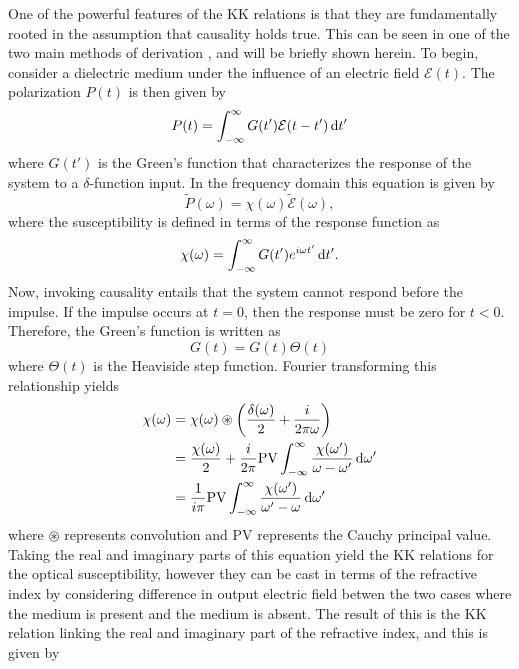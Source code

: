 One of the powerful features of the KK relations is that they are fundamentally rooted in the assumption that causality holds true.  This can be seen in one of the two main methods of derivation \cite{hutchingsKramersKronigRelationsNonlinear1992, jacksonClassicalElectrodynamics1999, arfkenMathematicalMethodsPhysicists2013}, and will be briefly shown herein.   To begin, consider a dielectric medium under the influence of an electric field $\mathcal{E}(t)$.  The polarization $P(t)$ is then given by
\begin{equation}
	P(t)=\int_{-\infty}^{\infty}G(t')\mathcal{E}(t-t') \mathop{}\!\mathrm{d} t'
\end{equation} 
where $G(t')$ is the Green's function that characterizes the response of the system to a $\delta$-function input.  In the frequency domain this equation is given by
\begin{equation}
	\tilde{P}(\omega)=\chi(\omega)\tilde{\mathcal{E}}(\omega),
\end{equation}
where the susceptibility is defined in terms of the response function as
\begin{equation}
	\chi(\omega)=\int_{-\infty}^{\infty}G(t')e^{i\omega t'}\mathop{}\!\mathrm{d} t'.
\end{equation}
Now, invoking causality entails that the system cannot respond before the impulse.  If the impulse occurs at $t=0$, then the response must be zero for $t<0$.  Therefore, the Green's function is written as
\begin{equation}
	G(t)=G(t)\Theta(t)
\end{equation}
where $\Theta(t)$ is the Heaviside step function.  Fourier transforming this relationship yields
\begin{equation}
	\label{eqn:KK_chi}
	\begin{aligned}
		\chi(\omega) &= \chi(\omega) \circledast \bigg(\frac{\delta(\omega)}{2} + \frac{i}{2\pi\omega}\bigg)\\
		& = \frac{\chi(\omega)}{2} + \frac{i}{2\pi} \mathrm{PV} \int_{-\infty}^{\infty}\frac{\chi(\omega')}{\omega - \omega'}\mathop{}\!\mathrm{d}\omega'\\
		& = \frac{1}{i\pi} \mathrm{PV} \int_{-\infty}^{\infty}\frac{\chi(\omega')}{\omega' - \omega} \mathop{}\!\mathrm{d} \omega'
	\end{aligned}
\end{equation}
where $\circledast$ represents convolution and  $\mathrm{PV}$ represents the Cauchy principal value.  Taking the real and imaginary parts of this equation yield the KK relations for the optical susceptibility, however they can be cast in terms of the refractive index by considering difference in output electric field betwen the two cases where the medium is present and the medium is absent.  The result of this is the KK relation linking the real and imaginary part of the refractive index, and this is given by
